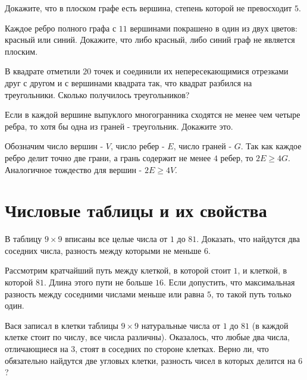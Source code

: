 \documentclass[12pt]{book}
\begin{document}
\begin{task}
Докажите, что в плоском графе есть вершина, степень которой не превосходит $5$. 
\end{task}

\begin{task}
Каждое ребро полного графа с $11$ вершинами покрашено в один из двух цветов: красный или синий. Докажите, что либо красный, либо синий граф не является плоским.
\end{task}

\begin{task}
В квадрате отметили $20$ точек и соединили их непересекающимися отрезками друг с другом и с вершинами квадрата так, что квадрат разбился на треугольники. Сколько получилось треугольников? 
\end{task}


\begin{task}
Если в каждой вершине выпуклого многогранника сходятся не менее чем четыре ребра, то хотя бы одна из граней - треугольник. Докажите это.
\end{task}

\begin{solution}
Обозначим число вершин - $V$, число ребер - $E$, число граней - $G$. Так как каждое ребро делит точно две грани, а грань содержит не менее $4$ ребер, то $2E \geqslant 4G$. Аналогичное тождество для вершин - $2E \geqslant 4V$. 
\end{solution}

\section*{Числовые таблицы и их свойства}


\begin{task} В таблицу $9 \times 9$ вписаны все целые числа от $1$ до $81$. Доказать, что найдутся два соседних числа, разность между которыми не меньше $6$. 
\end{task}

\begin{solution}
Рассмотрим кратчайший путь между клеткой, в которой стоит $1$, и клеткой, в которой $81$. Длина этого пути не больше $16$. Если допустить, что максимальная разность между соседними числами меньше или равна $5$, то такой путь только один.   
\end{solution}

\begin{task} 
Вася записал в клетки таблицы $9 \times 9$ натуральные числа от $1$ до $81$ (в каждой клетке стоит по числу, все числа различны). Оказалось, что любые два числа, отличающиеся на $3$, стоят в соседних по стороне клетках. Верно ли, что обязательно найдутся две угловых клетки, разность чисел в которых делится на $6$?
\end{task}
\end{document}
